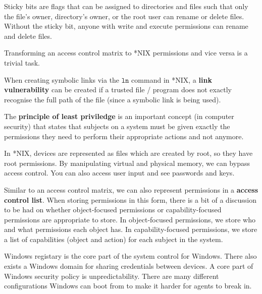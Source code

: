 \begin{example}
    Sticky bits are flags that can be assigned to directories and files such that only the file's owner, directory's owner, or the root user can rename or delete files. Without the sticky bit, anyone with write and execute permissions can rename and delete files.
\end{example}

Transforming an access control matrix to *NIX permissions and vice versa is a trivial task.

\begin{definition}
    When creating symbolic links via the $\texttt{ln}$ command in *NIX, a \textbf{link vulnerability} can be created if a trusted file / program does not exactly recognise the full path of the file (since a symbolic link is being used).
\end{definition}

\begin{definition}
    The \textbf{principle of least priviledge} is an important concept (in computer security) that states that subjects on a system must be given exactly the permissions they need to perform their appropriate actions and not anymore.
\end{definition}

\begin{definition}
    In *NIX, devices are represented as files which are created by root, so they have root permissions. By manipulating virtual and physical memory, we can bypass access control. You can also access user input and see passwords and keys.
\end{definition}

Similar to an access control matrix, we can also represent permissions in a \textbf{access control list}. When storing permissions in this form, there is a bit of a discussion to be had on whether object-focused permissions or capability-focused permissions are appropriate to store. In object-focused permissions, we store who and what permissions each object has. In capability-focused permissions, we store a list of capabilities (object and action) for each subject in the system.

\begin{example}[Windows]
    Windows registary is the core part of the system control for Windows. There also exists a Windows domain for sharing credentials between devices. A core part of Windows security policy is unpredictability. There are many different configurations Windows can boot from to make it harder for agents to break in.
\end{example}

